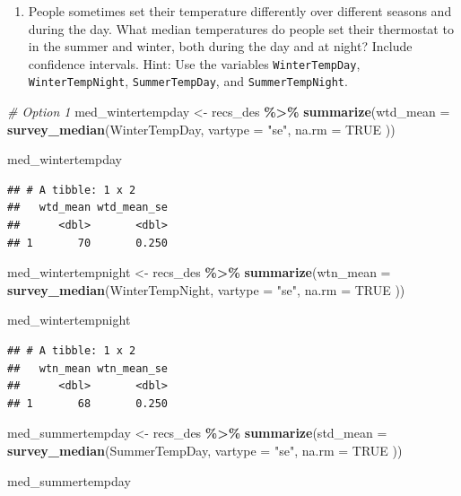 \documentclass[
]{krantz}
\makeatletter
\newenvironment{Shaded}{\begin{snugshade}}{\end{snugshade}}
\newcommand{\AttributeTok}[1]{\textcolor[rgb]{0.27,0.27,0.27}{#1}}
\newcommand{\CommentTok}[1]{\textcolor[rgb]{0.37,0.37,0.37}{\textit{#1}}}
\newcommand{\ConstantTok}[1]{\textcolor[rgb]{0.37,0.37,0.37}{#1}}
\newcommand{\FunctionTok}[1]{\textcolor[rgb]{0.27,0.27,0.27}{\textbf{#1}}}
\newcommand{\NormalTok}[1]{#1}
\newcommand{\OtherTok}[1]{\textcolor[rgb]{0.37,0.37,0.37}{#1}}
\newcommand{\SpecialCharTok}[1]{\textcolor[rgb]{0.43,0.43,0.43}{\textbf{#1}}}
\newcommand{\StringTok}[1]{\textcolor[rgb]{0.5,0.5,0.5}{#1}}
\providecommand{\tightlist}{%
  \setlength{\itemsep}{0pt}\setlength{\parskip}{0pt}}
\newenvironment{kframe}{%
\medskip{}
\setlength{\fboxsep}{.8em}
 \def\at@end@of@kframe{}%
 \ifinner\ifhmode%
  \def\at@end@of@kframe{\end{minipage}}%
  \begin{minipage}{\columnwidth}%
 \fi\fi%
 \def\FrameCommand##1{\hskip\@totalleftmargin \hskip-\fboxsep
 \colorbox{shadecolor}{##1}\hskip-\fboxsep
     \hskip-\linewidth \hskip-\@totalleftmargin \hskip\columnwidth}%
 \MakeFramed {\advance\hsize-\width
   \@totalleftmargin\z@ \linewidth\hsize
   \@setminipage}}%
 {\par\unskip\endMakeFramed%
 \at@end@of@kframe}
\renewenvironment{Shaded}{\begin{kframe}}{\end{kframe}}
\makeatother
\begin{document}
\begin{enumerate}
\def\labelenumi{\arabic{enumi}.}
\setcounter{enumi}{6}
\tightlist
\item
  People sometimes set their temperature differently over different seasons and during the day. What median temperatures do people set their thermostat to in the summer and winter, both during the day and at night? Include confidence intervals. Hint: Use the variables \texttt{WinterTempDay}, \texttt{WinterTempNight}, \texttt{SummerTempDay}, and \texttt{SummerTempNight}.
\end{enumerate}

\begin{Shaded}
\begin{Highlighting}[]
\CommentTok{\# Option 1}
\NormalTok{med\_wintertempday }\OtherTok{\textless{}{-}}\NormalTok{ recs\_des }\SpecialCharTok{\%\textgreater{}\%}
  \FunctionTok{summarize}\NormalTok{(}\AttributeTok{wtd\_mean =} \FunctionTok{survey\_median}\NormalTok{(WinterTempDay,}
    \AttributeTok{vartype =} \StringTok{"se"}\NormalTok{,}
    \AttributeTok{na.rm =} \ConstantTok{TRUE}
\NormalTok{  ))}

\NormalTok{med\_wintertempday}
\end{Highlighting}
\end{Shaded}

\begin{verbatim}
## # A tibble: 1 x 2
##   wtd_mean wtd_mean_se
##      <dbl>       <dbl>
## 1       70       0.250
\end{verbatim}

\begin{Shaded}
\begin{Highlighting}[]
\NormalTok{med\_wintertempnight }\OtherTok{\textless{}{-}}\NormalTok{ recs\_des }\SpecialCharTok{\%\textgreater{}\%}
  \FunctionTok{summarize}\NormalTok{(}\AttributeTok{wtn\_mean =} \FunctionTok{survey\_median}\NormalTok{(WinterTempNight,}
    \AttributeTok{vartype =} \StringTok{"se"}\NormalTok{,}
    \AttributeTok{na.rm =} \ConstantTok{TRUE}
\NormalTok{  ))}

\NormalTok{med\_wintertempnight}
\end{Highlighting}
\end{Shaded}

\begin{verbatim}
## # A tibble: 1 x 2
##   wtn_mean wtn_mean_se
##      <dbl>       <dbl>
## 1       68       0.250
\end{verbatim}

\begin{Shaded}
\begin{Highlighting}[]
\NormalTok{med\_summertempday }\OtherTok{\textless{}{-}}\NormalTok{ recs\_des }\SpecialCharTok{\%\textgreater{}\%}
  \FunctionTok{summarize}\NormalTok{(}\AttributeTok{std\_mean =} \FunctionTok{survey\_median}\NormalTok{(SummerTempDay,}
    \AttributeTok{vartype =} \StringTok{"se"}\NormalTok{,}
    \AttributeTok{na.rm =} \ConstantTok{TRUE}
\NormalTok{  ))}

\NormalTok{med\_summertempday}
\end{Highlighting}
\end{Shaded}
\end{document}
